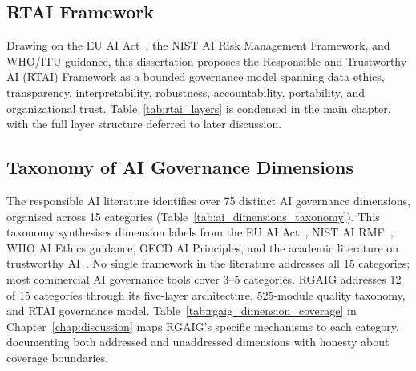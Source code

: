 \subsection{RTAI Framework}

Drawing on the EU AI Act~\cite{eu2021aiact}, the NIST AI Risk Management Framework, and WHO/ITU guidance, this dissertation proposes the Responsible and Trustworthy AI (RTAI) Framework as a bounded governance model spanning data ethics, transparency, interpretability, robustness, accountability, portability, and organizational trust. Table~\ref{tab:rtai_layers} is condensed in the main chapter, with the full layer structure deferred to later discussion.

%

\subsection{Taxonomy of AI Governance Dimensions}

The responsible AI literature identifies over 75 distinct AI governance dimensions, organised across 15 categories (Table~\ref{tab:ai_dimensions_taxonomy}). This taxonomy synthesises dimension labels from the EU AI Act~\cite{eu2021aiact}, NIST AI RMF~\cite{nist2023airm}, WHO AI Ethics guidance, OECD AI Principles, and the academic literature on trustworthy AI~\cite{floridi2018ai4people, arrieta2020xai}. No single framework in the literature addresses all 15 categories; most commercial AI governance tools cover 3--5 categories. RGAIG addresses 12 of 15 categories through its five-layer architecture, 525-module quality taxonomy, and RTAI governance model. Table~\ref{tab:rgaig_dimension_coverage} in Chapter~\ref{chap:discussion} maps RGAIG's specific mechanisms to each category, documenting both addressed and unaddressed dimensions with honesty about coverage boundaries.

